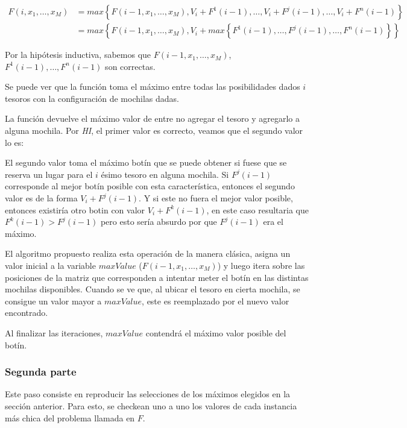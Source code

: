     \begin{align*}
    F(i, x_1,\dots,x_M) &= 	max\left\{ F(i-1, x_1, \dots, x_M), V_i + F^1(i-1), \dots,
	        V_i + F^j(i-1), \dots, V_i + F^n(i-1)\right\} \\ &= max\left\{F(i-1, x_1,
	        \dots, x_M), V_i + max\left\{F^1(i-1), \dots, F^j(i-1), \dots, F^n(i-1)\right\}\right\}    
    \end{align*}
    
    Por la hipótesis inductiva, sabemos que $ F(i-1, x_1, \dots, x_M)$, $F^1(i-1),\dots, F^n(i-1)$ son correctas.
    
    Se puede ver que la función toma el máximo entre todas las posibilidades dados $i$ tesoros con la configuración de mochilas dadas.
    
    La función devuelve el máximo valor de entre no agregar el tesoro y agregarlo a alguna mochila. Por \textit{HI}, el primer valor es correcto, veamos que el segundo valor lo es:
    
    El segundo valor toma el máximo botín que se puede obtener si fuese que se reserva un lugar para el $i$ ésimo tesoro en alguna mochila.
    Si $F^j(i-1)$ corresponde al mejor botín posible con esta característica, entonces el segundo valor es de la forma $V_i + F^j(i-1)$. Y si este no fuera el mejor valor posible, entonces existiría otro botin con valor $V_i + F^k(i-1)$, en este caso resultaria que $F^k(i-1) > F^j(i-1)$ pero esto sería absurdo por que $F^j(i-1)$ era el máximo.
    
    El algoritmo propuesto realiza esta operación de la manera clásica, asigna un valor inicial a la variable $maxValue$ ($ F(i-1, x_1, \dots, x_M)$) y luego itera sobre las posiciones de la matriz que corresponden a intentar meter el botín en las distintas mochilas disponibles. Cuando se ve que, al ubicar el tesoro en cierta mochila, se consigue un valor mayor a $maxValue$, este es reemplazado por el nuevo valor encontrado.
    
    Al finalizar las iteraciones, $maxValue$ contendrá el máximo valor posible del botín.
    
\subsubsection{Segunda parte}
Este paso consiste en reproducir las selecciones de los máximos elegidos en la sección anterior. Para esto, se checkean uno a uno los valores de cada instancia más chica del problema llamada en $F$.

